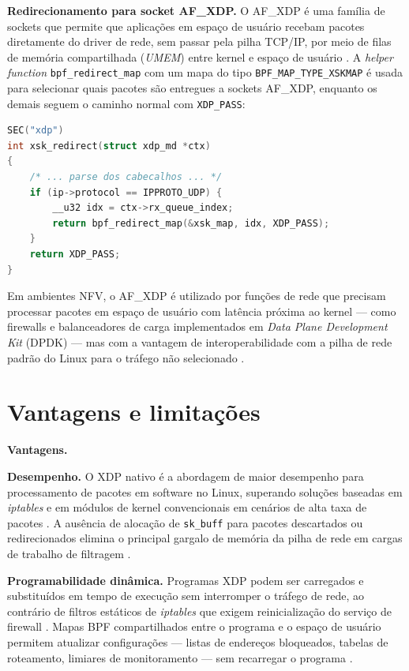 \textbf{Redirecionamento para socket AF\_XDP.}
O AF\_XDP é uma família de sockets que permite que aplicações em espaço de usuário
recebam pacotes diretamente do driver de rede, sem passar pela pilha TCP/IP,
por meio de filas de memória compartilhada (\textit{UMEM}) entre kernel e espaço
de usuário \cite{linuxkernel2024}.
A \textit{helper function} \texttt{bpf\_redirect\_map} com um mapa do tipo
\texttt{BPF\_MAP\_TYPE\_XSKMAP} é usada para selecionar quais pacotes são
entregues a sockets AF\_XDP, enquanto os demais seguem o caminho normal com
\texttt{XDP\_PASS}:

\begin{lstlisting}[language=C,
  caption={Redirecionamento seletivo de pacotes UDP para socket AF\_XDP.}]
SEC("xdp")
int xsk_redirect(struct xdp_md *ctx)
{
    /* ... parse dos cabecalhos ... */
    if (ip->protocol == IPPROTO_UDP) {
        __u32 idx = ctx->rx_queue_index;
        return bpf_redirect_map(&xsk_map, idx, XDP_PASS);
    }
    return XDP_PASS;
}
\end{lstlisting}

Em ambientes NFV, o AF\_XDP é utilizado por funções de rede que precisam processar
pacotes em espaço de usuário com latência próxima ao kernel --- como firewalls e
balanceadores de carga implementados em \textit{Data Plane Development Kit} (DPDK)
--- mas com a vantagem de interoperabilidade com a pilha de rede padrão do Linux
para o tráfego não selecionado \cite{venancio2021}.

\section{Vantagens e limitações}

\textbf{Vantagens.}

\textbf{Desempenho.}
O XDP nativo é a abordagem de maior desempenho para processamento de pacotes em
software no Linux, superando soluções baseadas em \textit{iptables} e em módulos
de kernel convencionais em cenários de alta taxa de pacotes \cite{cassagnes2020}.
A ausência de alocação de \texttt{sk\_buff} para pacotes descartados ou
redirecionados elimina o principal gargalo de memória da pilha de rede em cargas
de trabalho de filtragem \cite{gregg2019}.

\textbf{Programabilidade dinâmica.}
Programas XDP podem ser carregados e substituídos em tempo de execução sem
interromper o tráfego de rede, ao contrário de filtros estáticos de
\textit{iptables} que exigem reinicialização do serviço de firewall
\cite{linuxkernel2024}.
Mapas BPF compartilhados entre o programa e o espaço de usuário permitem atualizar
configurações --- listas de endereços bloqueados, tabelas de roteamento,
limiares de monitoramento --- sem recarregar o programa \cite{gregg2020}.

